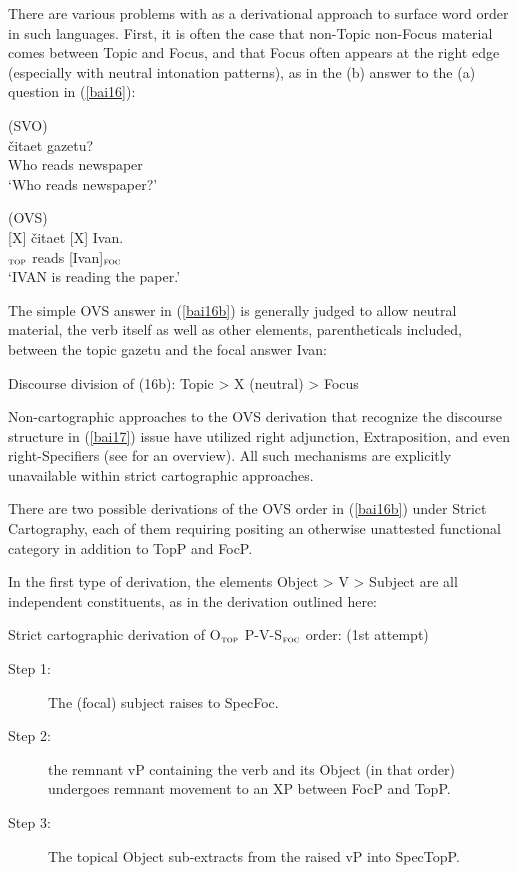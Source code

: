 \documentclass[output=paper]{langscibook}
\begin{document}
There are various problems with  as a derivational approach to surface word order in such languages. First, it is often the case that non-Topic non-Focus material comes between Topic and Focus, and that Focus often appears at the right edge (especially with neutral intonation patterns), as in the (b) answer to the (a) question in (\ref{bai16}):

\begin{exe}
\ex \label{bai16}
\begin{xlist}

\ex (SVO)\label{bai16a}\\
	{čitaet}	{gazetu?}  \\ 
Who reads newspaper \\
\glt `Who reads newspaper?'

\ex \label{bai16b}(OVS)\\
\gll {[Gazetu]}	[X]	{čitaet}		[X]	{Ivan.}\\
[newspaper]$_{\textsc{top}}$ {} reads {} [Ivan]$_{\textsc{foc}}$ \\
\glt `IVAN is reading the paper.'

\end{xlist}
\end{exe}

The simple OVS answer in (\ref{bai16b}) is generally judged to allow neutral material, the verb itself as well as other elements, parentheticals included, between the topic gazetu and the focal answer Ivan:  

\begin{exe}
\ex \label{bai17}
Discourse division of (16b):  Topic > X (neutral) > Focus 
\end{exe}

Non-cartographic approaches to the OVS derivation that recognize the discourse structure in (\ref{bai17}) issue have utilized right adjunction, Extraposition, and even right-Specifiers (see \citealt{Bailyn2012} for an overview). All such mechanisms are explicitly unavailable within strict cartographic approaches. 

There are two possible derivations of the OVS order in (\ref{bai16b}) under Strict Cartography, each of them requiring positing an otherwise unattested functional category in addition to TopP and FocP. 

In the first type of derivation, the elements Object > V > Subject are all independent constituents, as in the derivation outlined here:

\begin{exe}
\ex \label{bai18}
Strict cartographic derivation of O$_{\textsc{top}}$ P-V-S$_{\textsc{foc}}$ order: (1st attempt)
\begin{description}
\item[Step 1:]  The (focal) subject raises to SpecFoc.
\item[Step 2:]  the remnant vP containing the verb and its Object (in that order) undergoes remnant movement to an XP between FocP and TopP. 
\item[Step 3:]  The topical Object sub-extracts from the raised vP into SpecTopP.
\end{description}
\end{exe}
\end{document}
